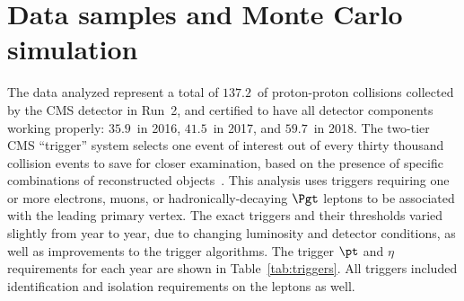 \section{Data samples and Monte Carlo simulation}
\label{sec:datasets}

The data analyzed represent a total of $137.2$~\fbinv of proton-proton collisions
collected by the CMS detector in Run~2, and certified to have all detector components
working properly: $35.9$~\fbinv in 2016, $41.5$~\fbinv in 2017, and $59.7$~\fbinv in 2018.
The two-tier CMS ``trigger'' system selects one event of interest out of every thirty
thousand collision events to save for closer examination, based on the presence of
specific combinations of reconstructed objects~\cite{Khachatryan:2016bia,Sirunyan:2020zal}.  This analysis
uses triggers requiring one or more electrons, muons, or hadronically-decaying $\Pgt$
leptons to be associated with the leading primary vertex. The exact triggers and their
thresholds varied slightly from year to year, due to changing luminosity and detector
conditions, as well as improvements to the trigger algorithms.  The trigger $\pt$ and
$\eta$ requirements for each year are shown in Table~\ref{tab:triggers}.  All
triggers included identification and isolation requirements on the leptons as well.

